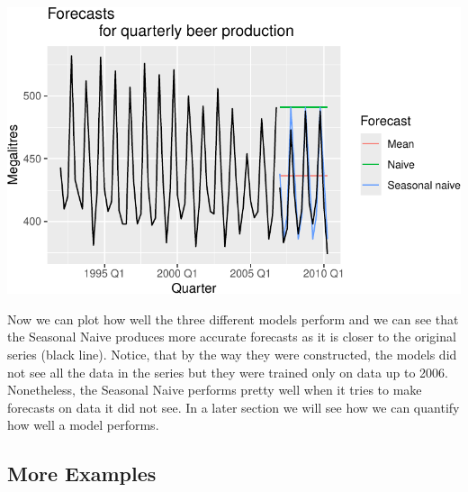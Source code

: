 \documentclass[
  letterpaper,
  DIV=11,
  numbers=noendperiod]{scrartcl}
\begin{document}
\begin{center}
\includegraphics{chapter5_review_files/figure-pdf/unnamed-chunk-22-1.pdf}
\end{center}

Now we can plot how well the three different models perform and we can
see that the Seasonal Naive produces more accurate forecasts as it is
closer to the original series (black line). Notice, that by the way they
were constructed, the models did not see all the data in the series but
they were trained only on data up to 2006. Nonetheless, the Seasonal
Naive performs pretty well when it tries to make forecasts on data it
did not see. In a later section we will see how we can quantify how well
a model performs.

\subsection{More Examples}\label{more-examples}
\end{document}
